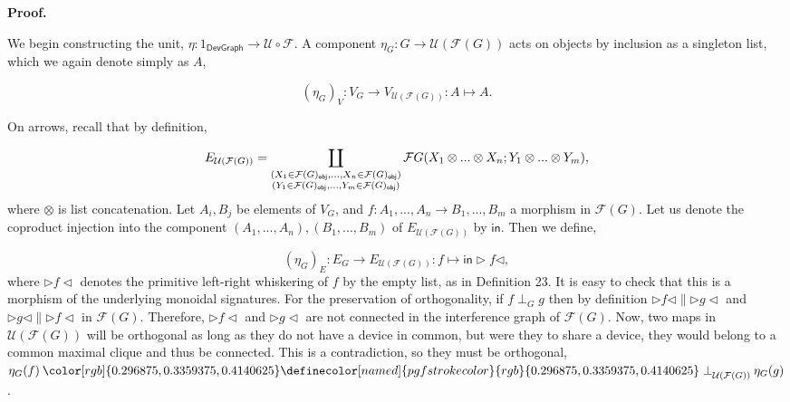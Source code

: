  
\par\medskip\noindent\textbf{Proof.}\par
 
 
We begin constructing the unit, $\eta:1_{\mathsf{DevGraph}}\to\mathcal{U}\circ\mathcal{F}$. A component $\eta_{G}:G\to\mathcal{U}(\mathcal{F}(G))$ acts on objects by inclusion as a singleton list, which we again denote simply as $A$,\par
    \[(\eta_{G})_{V}:V_{G}\to V_{\mathcal{U}(\mathcal{F}(G))}:A\mapsto A.\]    
 
 
On arrows, recall that by definition,\par
    \[E_{\mathcal{U}(\mathcal{F}(G))}=\coprod_{\begin{subarray}{c}(X_{1}\in\mathcal{F}(G)_{\mathsf{obj}},...,X_{n}\in\mathcal{F}(G)_{\mathsf{obj}})\\
(Y_{1}\in\mathcal{F}(G)_{\mathsf{obj}},...,Y_{m}\in\mathcal{F}(G)_{\mathsf{obj}})\end{subarray}}\mathcal{F}G(X_{1}\otimes...\otimes X_{n};Y_{1}\otimes...\otimes Y_{m}),\]    
where $\otimes$ is list concatenation. Let $A_{i},B_{j}$ be elements of $V_{G}$, and $f:A_{1},...,A_{n}\to B_{1},...,B_{m}$ a morphism in $\mathcal{F}(G)$. Let us denote the coproduct injection into the component $(A_{1},...,A_{n}),(B_{1},...,B_{m})$ of $E_{\mathcal{U}(\mathcal{F}(G))}$ by $\mathsf{in}$. Then we define,\par
    \[(\eta_{G})_{E}:E_{G}\to E_{\mathcal{U}(\mathcal{F}(G))}:f\mapsto{\mathsf{in}}\triangleright f\triangleleft,\]    
where $\triangleright f\triangleleft$ denotes the primitive left-right whiskering of $f$ by the empty list, as in Definition 23. It is easy to check that this is a morphism of the underlying monoidal signatures. For the preservation of orthogonality, if $f\perp_{G}g$ then by definition $\triangleright f\triangleleft\parallel\triangleright g\triangleleft$ and $\triangleright g\triangleleft\parallel\triangleright f\triangleleft$ in $\mathcal{F}(G)$. Therefore, $\triangleright f\triangleleft$ and $\triangleright g\triangleleft$ are not connected in the interference graph of $\mathcal{F}(G)$. Now, two maps in $\mathcal{U}(\mathcal{F}(G))$ will be orthogonal as long as they do not have a device in common, but were they to share a device, they would belong to a common maximal clique and thus be connected. This is a contradiction, so they must be orthogonal, $\eta_{G}(f)\mathbin{{\color[rgb]{0.296875,0.3359375,0.4140625}\definecolor[named]{pgfstrokecolor}{rgb}{0.296875,0.3359375,0.4140625}\perp}_{\mathcal{U}(\mathcal{F}(G))}}\eta_{G}(g)$.\par
 
